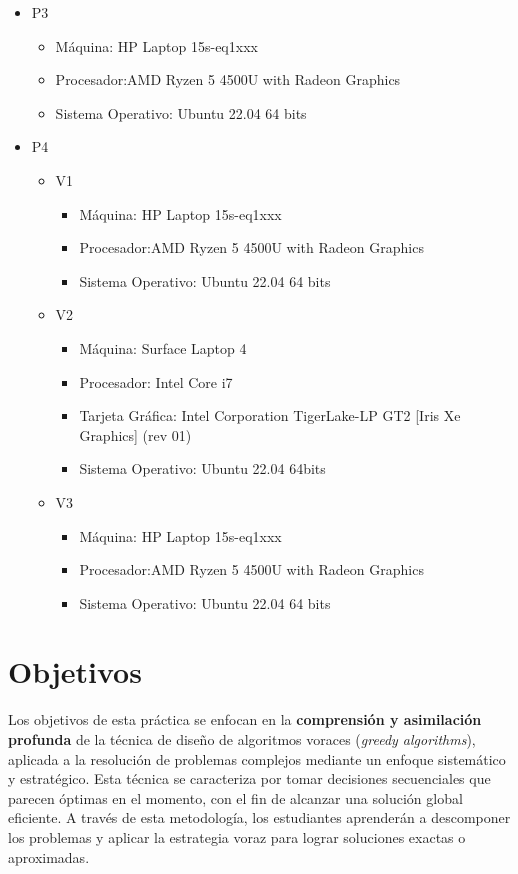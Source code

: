 \documentclass{article}
\begin{document}
\begin{itemize}
        \item P3
            \begin{itemize}
                \item Máquina: HP Laptop 15s-eq1xxx
                \item Procesador:AMD Ryzen 5 4500U with Radeon Graphics
                \item Sistema Operativo: Ubuntu 22.04 64 bits
            \end{itemize}
        \item P4
        \begin{itemize}
            \item V1        \begin{itemize}
                \item Máquina: HP Laptop 15s-eq1xxx
                \item Procesador:AMD Ryzen 5 4500U with Radeon Graphics
                \item Sistema Operativo: Ubuntu 22.04 64 bits
            \end{itemize}
            \item V2        \begin{itemize}
                \item Máquina: Surface Laptop 4
                \item Procesador: Intel Core i7
                \item Tarjeta Gráfica: Intel Corporation TigerLake-LP GT2 [Iris Xe Graphics] (rev 01)
                \item Sistema Operativo: Ubuntu 22.04 64bits
            \end{itemize}
            \item V3        \begin{itemize}
                \item Máquina: HP Laptop 15s-eq1xxx
                \item Procesador:AMD Ryzen 5 4500U with Radeon Graphics
                \item Sistema Operativo: Ubuntu 22.04 64 bits
            \end{itemize}
        \end{itemize}
        


    \end{itemize}
        
\newpage
\section{Objetivos}
Los objetivos de esta práctica se enfocan en la \textbf{comprensión y asimilación profunda} de la técnica de diseño de algoritmos voraces (\textit{greedy algorithms}), aplicada a la resolución de problemas complejos mediante un enfoque sistemático y estratégico. Esta técnica se caracteriza por tomar decisiones secuenciales que parecen óptimas en el momento, con el fin de alcanzar una solución global eficiente. A través de esta metodología, los estudiantes aprenderán a descomponer los problemas y aplicar la estrategia voraz para lograr soluciones exactas o aproximadas.
\end{document}
